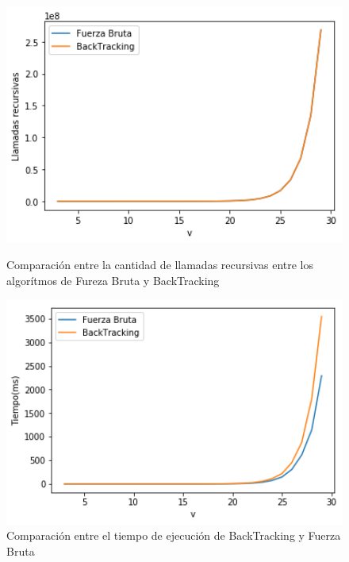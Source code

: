 \begin{figure}[H] 
    \centering
    \begin{minipage}{0.45\textwidth}
        \centering
        \includegraphics[width=1\textwidth]{img/nollega/backFBllamadas.png} %
        \caption{Comparaci\'on entre la cantidad de llamadas recursivas entre los algor\'itmos de
        Fureza Bruta y BackTracking}
        \label{fig:backFBllamadasnollega} 
    \end{minipage}\hfill
    \begin{minipage}{0.45\textwidth}
        \centering
        \includegraphics[width=1\textwidth]{img/nollega/backFBtiempo.png} %
        \caption{Comparaci\'on entre el tiempo de ejecuci\'on de BackTracking y Fuerza Bruta}
        \label{fig:backFBtiemponollega} 
    \end{minipage}
\end{figure}

